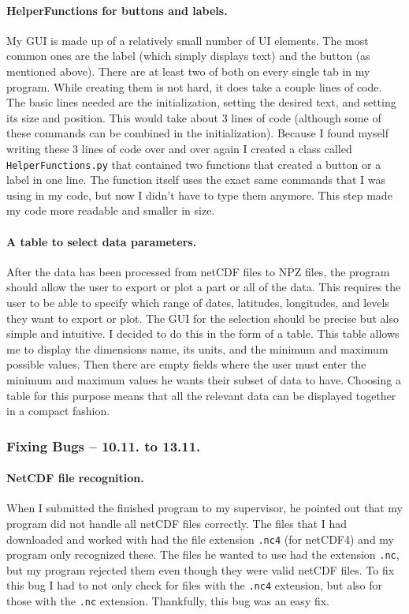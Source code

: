 \documentclass[../00_main.tex]{subfiles}
\begin{document}
\paragraph{HelperFunctions for buttons and labels.} My GUI is made up of a 
relatively
small number of UI elements. The most common ones are the label (which simply
displays text) and the button (as mentioned above). There are at least two of
both on every single tab in my program. While creating them is not hard, it
does take a couple lines of code. The basic lines needed are the
initialization, setting the desired text, and setting its size and position.
This would take about 3 lines of code (although some of these commands can be
combined in the initialization). Because I found myself writing these 3 lines
of code over and over again I created a class called
\texttt{HelperFunctions.py} that contained two functions that created a button
or a label in one line. The function itself uses the exact same commands that
I was using in my code, but now I didn't have to type them anymore. This step
made my code more readable and smaller in size.

\paragraph{A table to select data parameters.} After the data has been
processed from netCDF files to NPZ files, the program should allow the user to
export or plot a part or all of the data. This requires the user to be able to
specify which range of dates, latitudes, longitudes, and levels they want to
export or plot. The GUI for the selection should be precise but also simple and
intuitive. I decided to do this in the form of a table. This table allows me to
display the dimensions name, its units, and the minimum and maximum possible
values. Then there are empty fields where the user must enter the minimum and
maximum values he wants their subset of data to have. Choosing a table for this
purpose means that all the relevant data can be displayed together in a compact
fashion.

\subsubsection{Fixing Bugs -- 10.11. to 13.11.}

\paragraph{NetCDF file recognition.} When I submitted the finished program to
my supervisor, he pointed out that my program did not handle all netCDF files
correctly. The files that I had downloaded and worked with had the file
extension \texttt{.nc4} (for netCDF4) and my program only recognized these. The
files he wanted to use had the extension \texttt{.nc}, but my program rejected
them even though they were valid netCDF files. To fix this bug I had to not
only check for files with the \texttt{.nc4} extension, but also for those with
the \texttt{.nc} extension. Thankfully, this bug was an easy fix.
\end{document}
